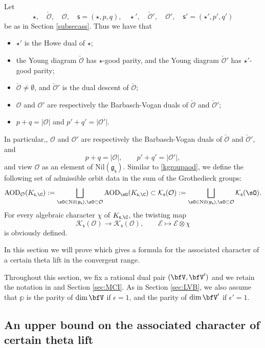 \documentclass[12pt,a4paper]{amsart}
\def\abs#1{\left|{#1}\right|}
\newcommand{\CE}{{\mathcal {E}}}
\newcommand{\CK}{{\mathcal {K}}}
\newcommand{\CO}{{\mathcal {O}}}
\newcommand{\g}{\mathfrak g}
\newcommand{\p}{\mathfrak p}
\numberwithin{equation}{section}
\theoremstyle{remark}
\begin{document}
Let
\[
\star, \quad \check \CO,  \quad\CO,  \quad\mathsf s=(\star, p,q),  \quad\star',  \quad \check \CO',  \quad\CO',  \quad \mathsf s'=(\star', p',q')
\]
be as in Section \ref{subsecass}. Thus we have that
\begin{itemize}
\item $\star'$ is the Howe dual of $\star$;
\item the Young diagram $\check \CO$ has $\star$-good parity, and the Young diagram $\check \CO'$ has $\star'$-good parity;
\item
 $\check \CO\neq \emptyset$, and $\check \CO' $ is  the dual descent of $\check \CO$;
 \item
  $\CO$ and $\CO'$ are respectively the Barbasch-Vogan duals of $\check \CO$ and $\check \CO'$;
  \item $ p+q=\abs{\CO}$ and $p'+q'=\abs{\CO'}$.
\end{itemize}


 In particular,,  $\CO$ and $\CO'$ are respectively the Barbasch-Vogan duals of $\check \CO$ and $\check \CO'$, and
\[
p+q=\abs{\CO}, \qquad p'+q'=\abs{\CO'},
\]
and view $\CO$ as an element of $\mathrm{Nil}(\g_\mathsf s)$. Similar to \eqref{kgroupaod}, we define the following set of admissible orbit data in the sum of the Grothedieck groups:
\[
  \mathrm{AOD}_{\CO}(K_{\mathsf s,\C}):=\bigsqcup_{\sO\in \mathrm{Nil}(\p_\mathsf s), \sO\subset \CO } \mathrm{AOD}_{\sO}(K_{\mathsf s,\C})\subset
  \CK_{\mathsf s}(\CO):=\bigsqcup_{\sO\in \mathrm{Nil}(\p_\mathsf s), \sO\subset \CO }\CK_{\mathsf s}(\sO).
\]
For every algebraic character $\chi$ of $K_{\mathsf s,\C}$, the twisting map
\[
\CK_{\mathsf s}(\CO)\rightarrow \CK_{\mathsf s}(\CO), \qquad \CE\mapsto \CE\otimes \chi
\]
is obviously defined.



In this section we will prove  which gives a formula for the
associated character of a certain theta lift in the convergent range.

Throughout this section, we fix a rational dual pair $(\bfV,\bfV')$ and
we retain the notation in  and Section \ref{sec:MCI}.
As in Section \ref{sec:LVB}, we also
assume that $\mathbb p$ is the parity of $\dim \bfV$ if $\epsilon=1$,
and  the parity of $\dim \bfV'$ if $\epsilon'=1$.

\subsection{An upper bound on the associated character of certain theta lift}
\end{document}
